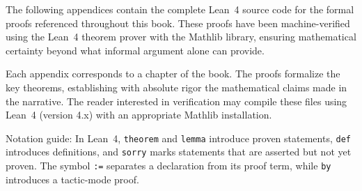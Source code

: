 \documentclass[11pt,openright,twoside]{book}
\def\textit#1{#1}%
\begin{document}
The following appendices contain the complete Lean~4 source code for the formal 
proofs referenced throughout this book. These proofs have been machine-verified 
using the Lean~4 theorem prover with the Mathlib library, ensuring mathematical 
certainty beyond what informal argument alone can provide.

Each appendix corresponds to a chapter of the book. The proofs formalize the key 
theorems, establishing with absolute rigor the mathematical claims made in the 
narrative. The reader interested in verification may compile these files using 
Lean~4 (version 4.x) with an appropriate Mathlib installation.

\bigskip
\noindent\textit{Notation guide:} In Lean~4, \texttt{theorem} and \texttt{lemma} 
introduce proven statements, \texttt{def} introduces definitions, and \texttt{sorry} 
marks statements that are asserted but not yet proven. The symbol \texttt{:=} 
separates a declaration from its proof term, while \texttt{by} introduces a 
tactic-mode proof.

\cleardoublepage



\cleardoublepage
\printindex
\end{document}
